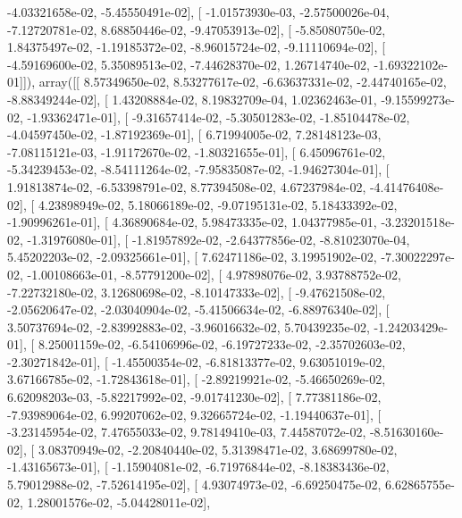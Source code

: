 \documentclass{article}
\begin{document}
         -4.03321658e-02,  -5.45550491e-02],
       [ -1.01573930e-03,  -2.57500026e-04,  -7.12720781e-02,
          8.68850446e-02,  -9.47053913e-02],
       [ -5.85080750e-02,   1.84375497e-02,  -1.19185372e-02,
         -8.96015724e-02,  -9.11110694e-02],
       [ -4.59169600e-02,   5.35089513e-02,  -7.44628370e-02,
          1.26714740e-02,  -1.69322102e-01]]), array([[  8.57349650e-02,   8.53277617e-02,  -6.63637331e-02,
         -2.44740165e-02,  -8.88349244e-02],
       [  1.43208884e-02,   8.19832709e-04,   1.02362463e-01,
         -9.15599273e-02,  -1.93362471e-01],
       [ -9.31657414e-02,  -5.30501283e-02,  -1.85104478e-02,
         -4.04597450e-02,  -1.87192369e-01],
       [  6.71994005e-02,   7.28148123e-03,  -7.08115121e-03,
         -1.91172670e-02,  -1.80321655e-01],
       [  6.45096761e-02,  -5.34239453e-02,  -8.54111264e-02,
         -7.95835087e-02,  -1.94627304e-01],
       [  1.91813874e-02,  -6.53398791e-02,   8.77394508e-02,
          4.67237984e-02,  -4.41476408e-02],
       [  4.23898949e-02,   5.18066189e-02,  -9.07195131e-02,
          5.18433392e-02,  -1.90996261e-01],
       [  4.36890684e-02,   5.98473335e-02,   1.04377985e-01,
         -3.23201518e-02,  -1.31976080e-01],
       [ -1.81957892e-02,  -2.64377856e-02,  -8.81023070e-04,
          5.45202203e-02,  -2.09325661e-01],
       [  7.62471186e-02,   3.19951902e-02,  -7.30022297e-02,
         -1.00108663e-01,  -8.57791200e-02],
       [  4.97898076e-02,   3.93788752e-02,  -7.22732180e-02,
          3.12680698e-02,  -8.10147333e-02],
       [ -9.47621508e-02,  -2.05620647e-02,  -2.03040904e-02,
         -5.41506634e-02,  -6.88976340e-02],
       [  3.50737694e-02,  -2.83992883e-02,  -3.96016632e-02,
          5.70439235e-02,  -1.24203429e-01],
       [  8.25001159e-02,  -6.54106996e-02,  -6.19727233e-02,
         -2.35702603e-02,  -2.30271842e-01],
       [ -1.45500354e-02,  -6.81813377e-02,   9.63051019e-02,
          3.67166785e-02,  -1.72843618e-01],
       [ -2.89219921e-02,  -5.46650269e-02,   6.62098203e-03,
         -5.82217992e-02,  -9.01741230e-02],
       [  7.77381186e-02,  -7.93989064e-02,   6.99207062e-02,
          9.32665724e-02,  -1.19440637e-01],
       [ -3.23145954e-02,   7.47655033e-02,   9.78149410e-03,
          7.44587072e-02,  -8.51630160e-02],
       [  3.08370949e-02,  -2.20840440e-02,   5.31398471e-02,
          3.68699780e-02,  -1.43165673e-01],
       [ -1.15904081e-02,  -6.71976844e-02,  -8.18383436e-02,
          5.79012988e-02,  -7.52614195e-02],
       [  4.93074973e-02,  -6.69250475e-02,   6.62865755e-02,
          1.28001576e-02,  -5.04428011e-02],
\end{document}
